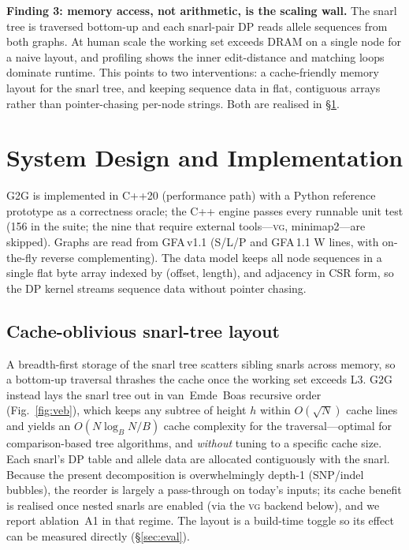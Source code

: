 \documentclass[conference]{IEEEtran}
\theoremstyle{plain}
\theoremstyle{definition}
\begin{document}
\textbf{Finding 3: memory access, not arithmetic, is the scaling wall.}
The snarl tree is traversed bottom-up and each snarl-pair DP reads allele
sequences from both graphs. At human scale the working set exceeds DRAM on a
single node for a naive layout, and profiling shows the inner edit-distance and
matching loops dominate runtime. This points to two interventions: a
cache-friendly memory layout for the snarl tree, and keeping sequence data in
flat, contiguous arrays rather than pointer-chasing per-node strings. Both are
realised in \S\ref{sec:system}.

\section{System Design and Implementation}
\label{sec:system}
\textsc{G2G} is implemented in C++20 (performance path) with a Python reference
prototype as a correctness oracle; the C++ engine passes every runnable unit test
(156 in the suite; the nine that require external tools---\textsc{vg},
minimap2---are skipped). Graphs are read from GFA\,v1.1 (S/L/P and GFA\,1.1
W lines, with on-the-fly reverse complementing). The data model keeps all node
sequences in a single flat byte array indexed by (offset, length), and adjacency
in CSR form, so the DP kernel streams sequence data without pointer chasing.

\subsection{Cache-oblivious snarl-tree layout}
A breadth-first storage of the snarl tree scatters sibling snarls across memory,
so a bottom-up traversal thrashes the cache once the working set exceeds L3.
\textsc{G2G} instead lays the snarl tree out in van~Emde~Boas recursive
order~\cite{vanemde1977preserving,frigo1999cache}
(Fig.~\ref{fig:veb}), which keeps any subtree of height $h$ within
$O(\sqrt{N})$ cache lines and yields an $O(N\log_B N / B)$ cache complexity for
the traversal---optimal for comparison-based tree algorithms, and \emph{without}
tuning to a specific cache size. Each snarl's DP table and allele data are
allocated contiguously with the snarl. Because the present decomposition is
overwhelmingly depth-1 (SNP/indel bubbles), the reorder is largely a pass-through
on today's inputs; its cache benefit is realised once nested snarls are enabled
(via the \textsc{vg} backend below), and we report ablation~A1 in that regime.
The layout is a build-time toggle so its effect can be measured directly
(\S\ref{sec:eval}).
\end{document}
